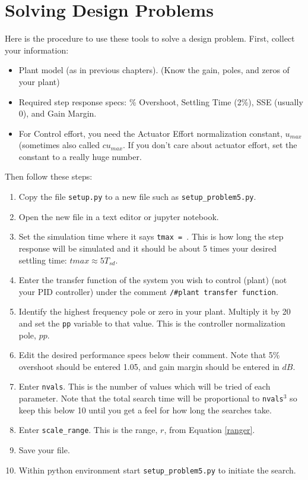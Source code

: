 \section{Solving Design Problems}


Here is the procedure to use these tools to solve a design problem.
First, collect your information:
\begin{itemize}
  \item  Plant model (as in previous chapters). (Know the gain, poles, and zeros of your plant)
  \item  Required step response specs:  \% Overshoot, Settling Time (2\%), SSE (usually 0), and Gain Margin.
  \item  For Control effort, you need the Actuator Effort normalization constant, $u_{max}$ (sometimes also called $cu_{max}$.   If you don't care about actuator effort, set the constant to a really huge number.
\end{itemize}

Then follow these steps:	%

\begin{enumerate}
  \item Copy the file {\tt setup.py} to a new file such as {\tt setup\_problem5.py}.
  \item Open the new file in a text editor or jupyter notebook.
  \item Set the simulation time where it says {\tt tmax = }.
This is how long the step response will be simulated and it should be about 5 times your desired settling time: $tmax \approx 5T_{sd}$.
  \item Enter the transfer function of the system you wish to control (plant) (not your PID controller) under the comment {\tt /\#plant transfer function}.
  \item Identify the highest frequency pole or zero in your plant.  Multiply it by 20 and set the {\tt pp} variable to that value. This is the controller normalization pole, $pp$.
  \item Edit the desired performance specs below their comment.  Note that 5\% overshoot should be entered 1.05, and gain margin should be entered in $dB$.
  \item Enter {\tt nvals}.  This is the number of values which will be tried of each parameter.
Note that the total search time will be proportional to {\tt nvals}$^3$ so keep this below 10 until you get a feel for how long the searches take.
  \item Enter {\tt scale\_range}.  This is the range, $r$, from Equation \ref{ranger}.
  \item Save your file.
  \item Within python environment start {\tt setup\_problem5.py} to initiate the search.
\end{enumerate}


